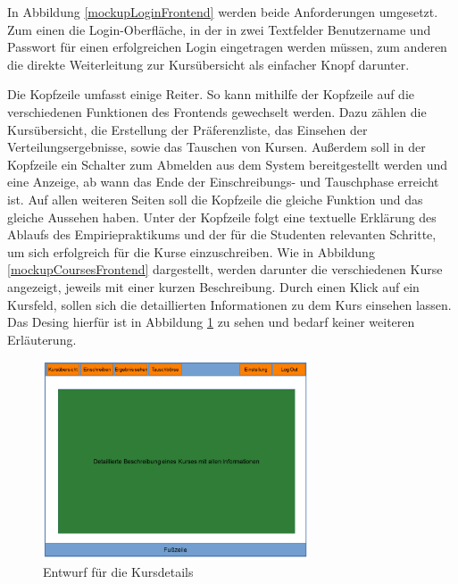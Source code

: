             In Abbildung \ref{mockupLoginFrontend} werden beide Anforderungen umgesetzt.
            Zum einen die Login-Oberfläche, in der in zwei Textfelder Benutzername und Passwort für einen erfolgreichen Login eingetragen werden müssen, zum anderen die direkte Weiterleitung zur Kursübersicht als einfacher Knopf darunter.

            Die Kopfzeile umfasst einige Reiter.
            So kann mithilfe der Kopfzeile auf die verschiedenen Funktionen des Frontends gewechselt werden. 
            Dazu zählen die Kursübersicht, die Erstellung der Präferenzliste, das Einsehen der Verteilungsergebnisse, sowie das Tauschen von Kursen.
            Außerdem soll in der Kopfzeile ein Schalter zum Abmelden aus dem System bereitgestellt werden und eine Anzeige, ab wann das Ende der Einschreibungs- und Tauschphase erreicht ist.
            Auf allen weiteren Seiten soll die Kopfzeile die gleiche Funktion und das gleiche Aussehen haben.
            Unter der Kopfzeile folgt eine textuelle Erklärung des Ablaufs des Empiriepraktikums und der für die Studenten relevanten Schritte, um sich erfolgreich für die Kurse einzuschreiben.
            Wie in Abbildung \ref{mockupCoursesFrontend} dargestellt, werden darunter die verschiedenen Kurse angezeigt, jeweils mit einer kurzen Beschreibung.
            Durch einen Klick auf ein Kursfeld, sollen sich die detaillierten Informationen zu dem Kurs einsehen lassen.
            Das Desing hierfür ist in Abbildung \ref{mockupDetailsFrontend} zu sehen und bedarf keiner weiteren Erläuterung.
            \begin{figure}[t]
            	\centering
            	\includegraphics[width=0.7\textwidth]{./design/images/MockUpsFrontend/frontendCoursedetails.png}
            	\caption{Entwurf für die Kursdetails}
            	\label{mockupDetailsFrontend}
            \end{figure}
